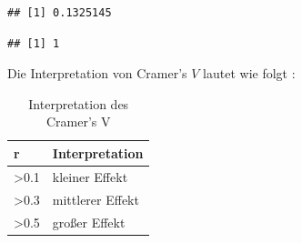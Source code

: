 \documentclass[
]{book}
\newenvironment{Shaded}{\begin{snugshade}}{\end{snugshade}}
\newcommand{\FunctionTok}[1]{\textcolor[rgb]{0.00,0.00,0.00}{#1}}
\newcommand{\NormalTok}[1]{#1}
\newcommand{\SpecialCharTok}[1]{\textcolor[rgb]{0.00,0.00,0.00}{#1}}
\begin{document}
\begin{Shaded}
\end{Shaded}

\begin{verbatim}
## [1] 0.1325145
\end{verbatim}

\begin{Shaded}
\end{Shaded}

\begin{verbatim}
## [1] 1
\end{verbatim}

Die Interpretation von Cramer's \(V\) lautet wie folgt \citet{ellis2010essential}:

\begin{table}[tbp]

\begin{center}
\begin{threeparttable}

\caption{\label{tab:unnamed-chunk-298}Interpretation des Cramer's V}

\begin{tabular}{ll}
\toprule
r & \multicolumn{1}{c}{Interpretation}\\
\midrule
>0.1 & kleiner Effekt\\
>0.3 & mittlerer Effekt\\
>0.5 & großer Effekt\\
\bottomrule
\end{tabular}

\end{threeparttable}
\end{center}

\end{table}
\end{document}

